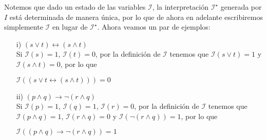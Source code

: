 \documentclass[letterpaper,11pt]{article}
\begin{document}
    \newpage
    Notemos que dado un estado de las variables $\mathcal{I}$, la 
    interpretación $\mathcal{I^{\star}}$ generada por $I$ está 
    determinada de manera única, por lo que de ahora en adelante
    escribiremos simplemente $\mathcal{I}$ en lugar de $\mathcal{I^{\star}}$.
    \newline
    Ahora veamos un par de ejemplos:
    \begin{itemize}
        \item[i)] $(s \lor t) \leftrightarrow (s \land t)$ \\
        Si $\mathcal{I}(s) = 1$, $\mathcal{I}(t) = 0$, por la definición 
        de $\mathcal{I}$ tenemos que 
        $\mathcal{I}(s \lor t) = 1$ y $\mathcal{I}(s \land t) = 0$,
        por lo que 
        \begin{center}
            $\mathcal{I}((s \lor t \leftrightarrow (s \land t))) = 0$
        \end{center}
        \item[ii)] $(p \land q) \rightarrow \neg (r \land q)$ \\
        Si $\mathcal{I}(p) = 1$, $\mathcal{I}(q) = 1$, $\mathcal{I}(r) = 0$,
        por la definición de $\mathcal{I}$ tenemos que  
        $\mathcal{I}(p \land q) = 1$, $\mathcal{I}(r \land q) = 0$ y
        $\mathcal{I}(\neg (r \land q)) = 1$, por lo que
        \begin{center}
            $\mathcal{I}((p \land q) \rightarrow \neg (r \land q)) = 1$
        \end{center}
    \end{itemize}
\end{document}
